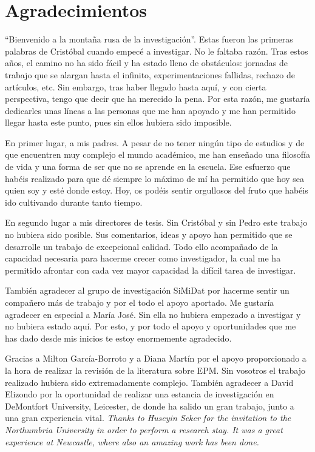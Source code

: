 \documentclass[c5paper,10pt,twoside]{book}	   	%
\begin{document}
\cleardoublepage
\clearpage{}\chapter*{Agradecimientos}



``Bienvenido a la montaña rusa de la investigación''. Estas fueron las primeras palabras de Cristóbal cuando empecé a investigar. No le faltaba razón. Tras estos años, el camino no ha sido fácil y ha estado lleno de obstáculos: jornadas de trabajo que se alargan hasta el infinito, experimentaciones fallidas, rechazo de artículos, etc. Sin embargo, tras haber llegado hasta aquí, y con cierta perspectiva, tengo que decir que ha merecido la pena. Por esta razón, me gustaría dedicarles unas líneas a las personas que me han apoyado y me han permitido llegar hasta este punto, pues sin ellos hubiera sido imposible.

En primer lugar, a mis padres. A pesar de no tener ningún tipo de estudios y de que encuentren muy complejo el mundo académico, me han enseñado una filosofía de vida y una forma de ser que no se aprende en la escuela. Ese esfuerzo que habéis realizado para que dé siempre lo máximo de mí ha permitido que hoy sea quien soy y esté donde estoy. Hoy, os podéis sentir orgullosos del fruto que habéis ido cultivando durante tanto tiempo.

En segundo lugar a mis directores de tesis. Sin Cristóbal y sin Pedro este trabajo no hubiera sido posible. Sus comentarios, ideas y apoyo han permitido que se desarrolle un trabajo de excepcional calidad. Todo ello acompañado de la capacidad necesaria para hacerme crecer como investigador, la cual me ha permitido afrontar con cada vez mayor capacidad la difícil tarea de investigar. 

También agradecer al grupo de investigación SiMiDat por hacerme sentir un compañero más de trabajo y por el todo el apoyo aportado. Me gustaría agradecer en especial a María José. Sin ella no hubiera empezado a investigar y no hubiera estado aquí. Por esto, y por todo el apoyo y oportunidades que me has dado desde mis inicios te estoy enormemente agradecido.

Gracias a Milton García-Borroto y a Diana Martín por el apoyo proporcionado a la hora de realizar la revisión de la literatura sobre EPM. Sin vosotros el trabajo realizado hubiera sido extremadamente complejo. También agradecer a David Elizondo por la oportunidad de realizar una estancia de investigación en DeMontfort University, Leicester, de donde ha salido un gran trabajo, junto a una gran experiencia vital. \textit{Thanks to Huseyin Seker for the invitation to the Northumbria University in order to perform a research stay. It was a great experience at Newcastle, where also an amazing work has been done.}
\end{document}
